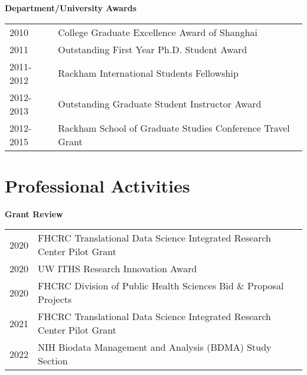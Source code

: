\documentclass[10pt]{article}
\begin{document}
\textbf{Department/University Awards}
\begin{table}[H]
\hskip0.9cm\begin{tabular}{p{1.6cm}p{12cm}}
2010 & College Graduate Excellence Award of Shanghai  \\
2011 & Outstanding First Year Ph.D. Student Award \\
2011-2012 & Rackham International Students Fellowship \\
2012-2013 & Outstanding Graduate Student Instructor Award\\
2012-2015 & Rackham School of Graduate Studies Conference Travel Grant
\end{tabular}
\end{table}

\section*{Professional Activities}



\textbf{Grant Review}
\begin{table}[H]
\hskip0.9cm\begin{tabular}{p{1.6cm}p{12cm}}
2020 & FHCRC Translational Data Science Integrated Research Center Pilot Grant \\
2020 & UW ITHS Research Innovation Award \\
2020 & FHCRC Division of Public Health Sciences Bid \& Proposal Projects\\
2021 & FHCRC Translational Data Science Integrated Research Center Pilot Grant\\
2022 & NIH Biodata Management and Analysis (BDMA) Study Section
\end{tabular}
\end{table}
\end{document}
